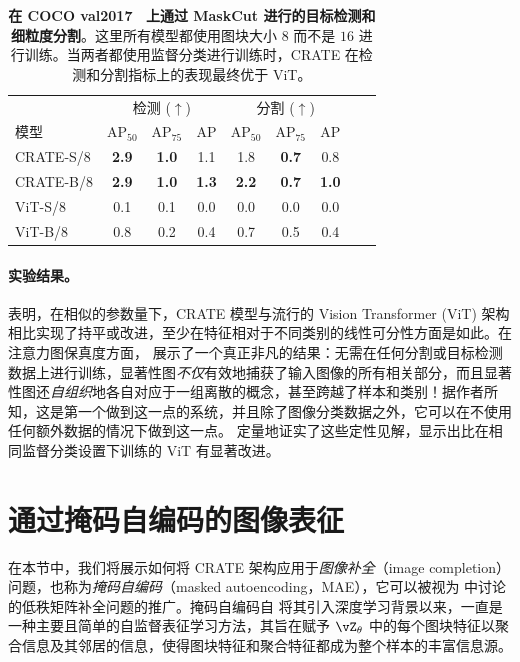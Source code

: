 \documentclass[../../book-main_zh.tex]{subfiles}
\begin{document}
\begin{table}
\caption{\small \textbf{在 COCO {val2017}~\citep{lin2014microsoft} 上通过 MaskCut 进行的目标检测和细粒度分割}。这里所有模型都使用图块大小 \(8\) 而不是 \(16\) 进行训练。当两者都使用监督分类进行训练时，CRATE 在检测和分割指标上的表现最终优于 ViT。}
\centering
\begin{tabular}{@{}lcccccccc@{}}
    \toprule
    &  \multicolumn{3}{c}{检测 (\(\uparrow\))} &
    \multicolumn{3}{c}{分割 (\(\uparrow\))} \\
    模型 & AP$_{50}$ & AP$_{75}$ & AP & AP$_{50}$ & AP$_{75}$ & AP  \\
    \midrule
    CRATE-S/8 & \textbf{2.9} & \textbf{1.0} & 1.1 & 1.8 & \textbf{0.7} & 0.8 \\
    CRATE-B/8 & \textbf{2.9} & \textbf{1.0} & \textbf{1.3} &
    \textbf{2.2} & \textbf{0.7} & \textbf{1.0} \\
    ViT-S/8 & 0.1& 0.1 & 0.0 & 0.0 & 0.0 & 0.0 \\
    ViT-B/8 & 0.8 & 0.2 & 0.4 & 0.7 & 0.5 & 0.4 \\
    \bottomrule
\end{tabular}
\label{tab:crate_detection_segmentation}
\end{table}

\paragraph{实验结果。}

 表明，在相似的参数量下，CRATE 模型与流行的 Vision Transformer (ViT) 架构相比实现了持平或改进，至少在特征相对于不同类别的线性可分性方面是如此。在注意力图保真度方面， 展示了一个真正非凡的结果：无需在任何分割或目标检测数据上进行训练，显著性图\textit{不仅}有效地捕获了输入图像的所有相关部分，而且显著性图还\textit{自组织}地各自对应于一组离散的概念，甚至跨越了样本和类别！据作者所知，这是第一个做到这一点的系统，并且除了图像分类数据之外，它可以在不使用任何额外数据的情况下做到这一点。 定量地证实了这些定性见解，显示出比在相同监督分类设置下训练的 ViT 有显著改进。

\section{通过掩码自编码的图像表征}\label{sec:image_completion}

在本节中，我们将展示如何将 CRATE 架构应用于\textit{图像补全}（image completion）问题，也称为\textit{掩码自编码}（masked autoencoding，MAE），它可以被视为  中讨论的低秩矩阵补全问题的推广。掩码自编码自 \cite{he2022masked} 将其引入深度学习背景以来，一直是一种主要且简单的自监督表征学习方法，其旨在赋予 \(\vZ_{\theta}\) 中的每个图块特征以聚合信息及其邻居的信息，使得图块特征和聚合特征都成为整个样本的丰富信息源。
\end{document}
